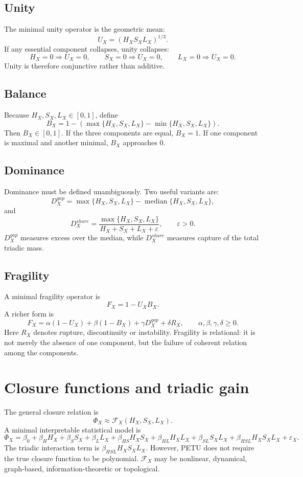 \documentclass[11pt,a4paper]{article}
\begin{document}
\subsection{Unity}

The minimal unity operator is the geometric mean:
\[
U_X=(H_XS_XL_X)^{1/3}.
\]
If any essential component collapses, unity collapses:
\[
H_X=0\Rightarrow U_X=0,
\qquad
S_X=0\Rightarrow U_X=0,
\qquad
L_X=0\Rightarrow U_X=0.
\]
Unity is therefore conjunctive rather than additive.

\subsection{Balance}

Because $H_X,S_X,L_X\in[0,1]$, define
\[
B_X=
1-
\left(
\max\{H_X,S_X,L_X\}
-
\min\{H_X,S_X,L_X\}
\right).
\]
Then $B_X\in[0,1]$.
If the three components are equal, $B_X=1$.
If one component is maximal and another minimal, $B_X$ approaches $0$.

\subsection{Dominance}

Dominance must be defined unambiguously. Two useful variants are:
\[
D_X^{gap}=
\max\{H_X,S_X,L_X\}
-
\operatorname{median}\{H_X,S_X,L_X\},
\]
and
\[
D_X^{share}=
\frac{\max\{H_X,S_X,L_X\}}
{H_X+S_X+L_X+\varepsilon},
\qquad \varepsilon>0.
\]
$D_X^{gap}$ measures excess over the median, while $D_X^{share}$ measures capture of the total triadic mass.

\subsection{Fragility}

A minimal fragility operator is
\[
F_X=1-U_XB_X.
\]
A richer form is
\[
F_X=
\alpha(1-U_X)
+
\beta(1-B_X)
+
\gamma D_X^{gap}
+
\delta R_X,
\qquad
\alpha,\beta,\gamma,\delta\geq0.
\]
Here $R_X$ denotes rupture, discontinuity or instability.
Fragility is relational: it is not merely the absence of one component, but the failure of coherent relation among the components.

\section{Closure functions and triadic gain}

The general closure relation is
\[
\Phi_X\approx\mathcal{F}_X(H_X,S_X,L_X).
\]
A minimal interpretable statistical model is
\[
\Phi_X =
\beta_0+\beta_HH_X+\beta_SS_X+\beta_LL_X
+\beta_{HS}H_XS_X+\beta_{HL}H_XL_X+\beta_{SL}S_XL_X
+\beta_{HSL}H_XS_XL_X+\varepsilon_X.
\]
The triadic interaction term is $\beta_{HSL}H_XS_XL_X$.
However, PETU does not require the true closure function to be polynomial.
$\mathcal{F}_X$ may be nonlinear, dynamical, graph-based, information-theoretic or topological.
\end{document}
